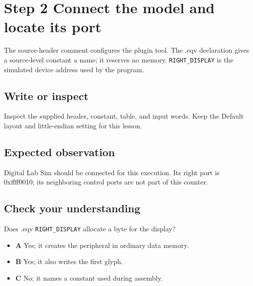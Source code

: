 \section{Step 2 Connect the model and locate its
  port}\label{005-seven-segment-counter-s02-step-2-connect-the-model-and-locate-its-port}

The source-header comment configures the plugin tool. The .eqv
declaration gives a source-level constant a name; it reserves no memory.
\texttt{RIGHT\_DISPLAY} is the simulated device address used by the
program.

\subsection{Write or
  inspect}\label{005-seven-segment-counter-s02-write-or-inspect}

Inspect the supplied header, constant, table, and input words. Keep the
Default layout and little-endian setting for this lesson.

\subsection{Expected
  observation}\label{005-seven-segment-counter-s02-expected-observation}

Digital Lab Sim should be connected for this execution. Its right port
is 0xffff0010; its neighboring control ports are not part of this
counter.

\subsection{Check your
  understanding}\label{005-seven-segment-counter-s02-check-your-understanding}

Does .eqv \texttt{RIGHT\_DISPLAY} allocate a byte for the display?

\begin{itemize}
  \tightlist
  \item
        \textbf{A} Yes; it creates the peripheral in ordinary data memory.
  \item
        \textbf{B} Yes; it also writes the first glyph.
  \item
        \textbf{C} No; it names a constant used during assembly.
\end{itemize}
